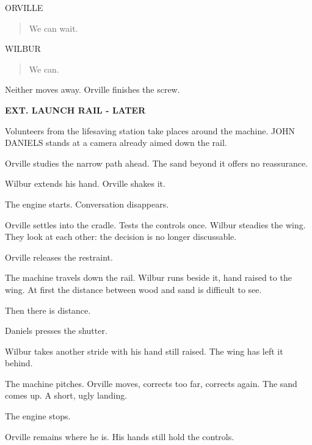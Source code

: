 \documentclass[12pt,letterpaper]{article}
\newcommand{\scene}[1]{\needspace{5\baselineskip}\vspace{8pt}\textbf{#1}\par}
\newcommand{\character}[1]{\needspace{4\baselineskip}\hspace*{2.2in}#1\par\nopagebreak}
\begin{document}
\character{ORVILLE}
\begin{quote}We can wait.\par\end{quote}

\character{WILBUR}
\begin{quote}We can.\par\end{quote}

Neither moves away. Orville finishes the screw.\par

\scene{EXT. LAUNCH RAIL - LATER}

Volunteers from the lifesaving station take places around the machine. JOHN DANIELS stands at a camera already aimed down the rail.\par

Orville studies the narrow path ahead. The sand beyond it offers no reassurance.\par

Wilbur extends his hand. Orville shakes it.\par

The engine starts. Conversation disappears.\par

Orville settles into the cradle. Tests the controls once. Wilbur steadies the wing. They look at each other: the decision is no longer discussable.\par

Orville releases the restraint.\par

The machine travels down the rail. Wilbur runs beside it, hand raised to the wing. At first the distance between wood and sand is difficult to see.\par

Then there is distance.\par

Daniels presses the shutter.\par

Wilbur takes another stride with his hand still raised. The wing has left it behind.\par

The machine pitches. Orville moves, corrects too far, corrects again. The sand comes up. A short, ugly landing.\par

The engine stops.\par

Orville remains where he is. His hands still hold the controls.\par
\end{document}
